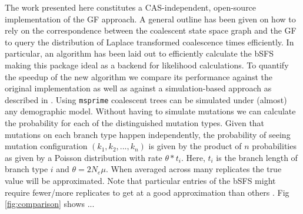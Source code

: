 \documentclass[10pt, a4]{article}
\begin{document}
The work presented here constitutes a CAS-independent, open-source implementation of the GF approach. A general outline has been given on how to rely on the correspondence between the coalescent state space graph and the GF to query the distribution of Laplace transformed coalescence times efficiently. In particular, an algorithm has been laid out to efficiently calculate the bSFS making this package ideal as a backend for likelihood calculations. To quantify the speedup of the new algorithm we compare its performance against the original implementation \citep{Lohse2011} as well as against a simulation-based approach as described in \citet{Beeravolu2018}. Using \texttt{msprime} \citep{Baumdicker2021} coalescent trees can be simulated under (almost) any demographic model. Without having to simulate mutations we can calculate the probability for each of the distinguished mutation types. Given that mutations on each branch type happen independently, the probability of seeing mutation configuration $(k_1, k_2, ..., k_n)$ is given by the product of $n$ probabilities as given by a Poisson distribution with rate $\theta * t_i$. Here, $t_i$ is the branch length of branch type $i$ and $\theta=2N_e\mu$. When averaged across many replicates the true value will be approximated. Note that particular entries of the bSFS might require fewer/more replicates to get at a good approximation than others \citep{Beeravolu2018}.  
Fig \ref{fig:comparison} shows ... %

\end{document}
